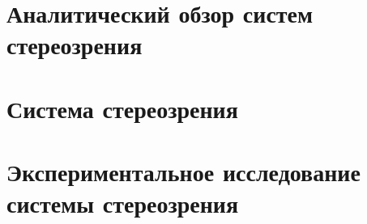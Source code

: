 \documentclass[a4paper,14pt]{extarticle} %
\begin{document}



\tableofcontents %
\clearpage


\section{Аналитический обзор систем стереозрения}

\newpage
\section{Система стереозрения}

\newpage
\section{Экспериментальное исследование системы стереозрения}

\newpage
{}

\newpage
{}
\printbibliography[heading=none] %


\newpage

\end{document}
